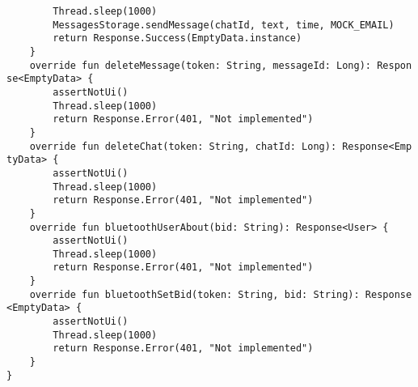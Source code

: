 \documentclass[listing]{espd}
\begin{document}
\begin{verbatim}
        Thread.sleep(1000)
        MessagesStorage.sendMessage(chatId, text, time, MOCK_EMAIL)
        return Response.Success(EmptyData.instance)
    }
    override fun deleteMessage(token: String, messageId: Long): Respon
se<EmptyData> {
        assertNotUi()
        Thread.sleep(1000)
        return Response.Error(401, "Not implemented")
    }
    override fun deleteChat(token: String, chatId: Long): Response<Emp
tyData> {
        assertNotUi()
        Thread.sleep(1000)
        return Response.Error(401, "Not implemented")
    }
    override fun bluetoothUserAbout(bid: String): Response<User> {
        assertNotUi()
        Thread.sleep(1000)
        return Response.Error(401, "Not implemented")
    }
    override fun bluetoothSetBid(token: String, bid: String): Response
<EmptyData> {
        assertNotUi()
        Thread.sleep(1000)
        return Response.Error(401, "Not implemented")
    }
}
\end{verbatim}
\end{document}
